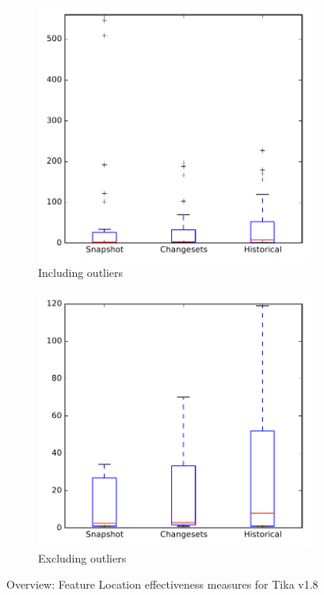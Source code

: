 
\begin{figure}
    \centering
    \begin{subfigure}{.4\textwidth}
        \centering
        \includegraphics[height=0.4\textheight]{figures/flt/all_tika}
        \caption{Including outliers}\label{fig:flt:all:tika_outlier}
    \end{subfigure}%
    \begin{subfigure}{.4\textwidth}
        \centering
        \includegraphics[height=0.4\textheight]{figures/flt/all_tika_no_outlier}
        \caption{Excluding outliers}\label{fig:flt:all:tika_no_outlier}
    \end{subfigure}
\caption{Overview: Feature Location effectiveness measures for Tika v1.8}
\label{fig:flt:all:tika}
\end{figure}
